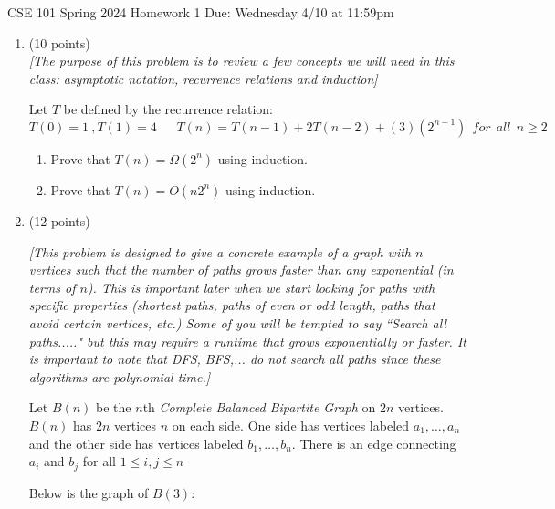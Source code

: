 \documentclass[10pt,letterpaper,unboxed,cm]{article}
\begin{document}
\hfill{CSE 101 Spring 2024}
\hfill{Homework 1}
\hfill{Due: Wednesday 4/10 at 11:59pm}

\begin{enumerate}


\item (10 points)\\
\emph{[The purpose of this problem is to review a few concepts we will need in this class: asymptotic notation, recurrence relations and induction]}

Let $T$ be defined by the recurrence relation:
$$T(0) = 1~,T(1) = 4~~~~~~~ T(n) = T(n-1) + 2T(n-2) + (3)(2^{n-1})~~for~~all~~n\geq 2$$

\begin{enumerate}
\item
Prove that $T(n)=\Omega(2^n)$ using induction.

\item
Prove that $T(n) = O(n2^n)$ using induction.

\end{enumerate}






\item (12 points)

\emph{[This problem is designed to give a concrete example of a graph with $n$ vertices such that the number of paths grows faster than any exponential (in terms of $n$). This is important later when we start looking for paths with specific properties (shortest paths, paths of even or odd length, paths that avoid certain vertices, etc.) Some of you will be tempted to say ``Search all paths....." but this may require a runtime that grows exponentially or faster. It is important to note that DFS, BFS,... do not search all paths since these algorithms are polynomial time.]}

Let $B(n)$ be the $n$th \emph{Complete Balanced Bipartite Graph} on $2n$ vertices. $B(n)$ has $2n$ vertices $n$ on each side. One side has vertices labeled $a_1,\dots,a_n$ and the other side has vertices labeled $b_1,\dots,b_n$. There is an edge connecting $a_i$ and $b_j$ for all $1\leq i,j\leq n$

Below is the graph of $B(3):$


\end{enumerate}
\end{document}
